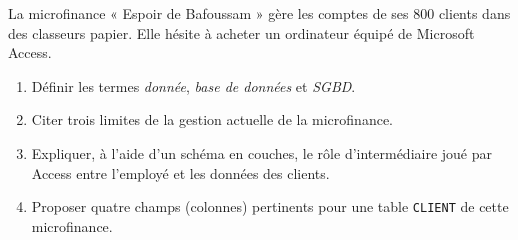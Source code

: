 \documentclass[11pt]{article}
\begin{document}
\begin{exercice}
La microfinance « Espoir de Bafoussam » gère les comptes de ses 800 clients dans des classeurs papier. Elle hésite à acheter un ordinateur équipé de Microsoft Access.
\begin{enumerate}
  \item Définir les termes \emph{donnée}, \emph{base de données} et \emph{SGBD}.
  \item Citer trois limites de la gestion actuelle de la microfinance.
  \item Expliquer, à l'aide d'un schéma en couches, le rôle d'intermédiaire joué par Access entre l'employé et les données des clients.
  \item Proposer quatre champs (colonnes) pertinents pour une table \texttt{CLIENT} de cette microfinance.
\end{enumerate}
\end{exercice}
\end{document}
